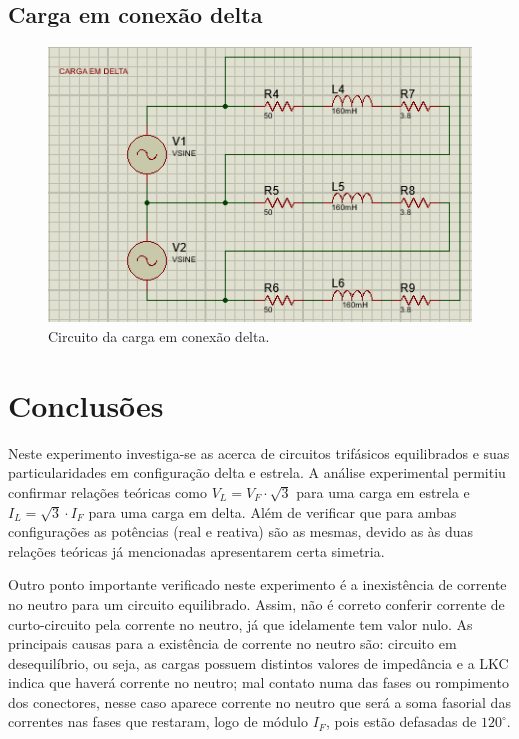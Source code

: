 \documentclass[a4paper,12pt,oneside,openany,table,xcdraw]{article}
\begin{document}
\subsection{Carga em conexão delta}
\begin{figure}[H]
\centering
\captionsetup{font=scriptsize}
\includegraphics[width=14cm]{sim2}
\caption{Circuito da carga em conexão delta.}
\label{sim2}
\end{figure}

\section{Conclusões} %
Neste experimento investiga-se as acerca de circuitos trifásicos equilibrados e suas particularidades em configuração delta e estrela. A análise experimental permitiu confirmar relações teóricas como $V_L=V_F\cdot\sqrt{3}$ para uma carga em estrela e $I_L = \sqrt{3}\cdot I_F$ para uma carga em delta. Além de verificar que para ambas configurações as potências (real e reativa) são as mesmas, devido as às duas relações teóricas já mencionadas apresentarem certa simetria.

Outro ponto importante verificado neste experimento é a inexistência de corrente no neutro para um circuito equilibrado. Assim, não é correto conferir corrente de curto-circuito pela corrente no neutro, já que idelamente tem valor nulo. As principais causas para a existência de corrente no neutro são: circuito em desequilíbrio, ou seja, as cargas possuem distintos valores de impedância e a LKC indica que haverá corrente no neutro; mal contato numa das fases ou rompimento dos conectores, nesse caso aparece corrente no neutro que será a soma fasorial das correntes nas fases que restaram, logo de módulo $I_F$, pois estão defasadas de $120^\circ$.  
\end{document}
